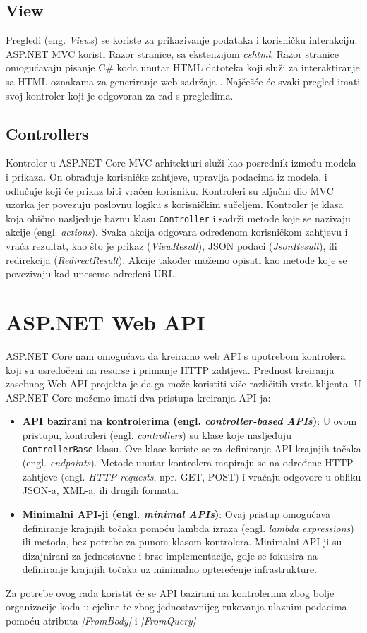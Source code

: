 \documentclass{foi}
\begin{document}
\subsection{View}
Pregledi (eng. \textit{Views}) se koriste za prikazivanje podataka i korisničku interakciju. ASP.NET MVC koristi Razor stranice, sa ekstenzijom \textit{cshtml}. Razor stranice omogućavaju pisanje C\# koda unutar HTML datoteka koji služi za interaktiranje sa HTML oznakama za generiranje web sadržaja \cite{Smith2022}. Najčešće će svaki pregled imati svoj kontroler koji je odgovoran za rad s pregledima.

\subsection{Controllers}
Kontroler u ASP.NET Core MVC arhitekturi služi kao posrednik između modela i prikaza. On obrađuje korisničke zahtjeve, upravlja podacima iz modela, i odlučuje koji će prikaz biti vraćen korisniku. Kontroleri su ključni dio MVC uzorka jer povezuju poslovnu logiku s korisničkim sučeljem.
Kontroler je klasa koja obično nasljeđuje baznu klasu \texttt{Controller} i sadrži metode koje se nazivaju akcije (engl. \textit{actions}). Svaka akcija odgovara određenom korisničkom zahtjevu i vraća rezultat, kao što je prikaz (\textit{ViewResult}), JSON podaci (\textit{JsonResult}), ili redirekcija (\textit{RedirectResult}).
Akcije također možemo opisati kao metode koje se povezivaju kad unesemo određeni URL. \cite{Walther2022}

\section{ASP.NET Web API}
ASP.NET Core nam omogućava da kreiramo web API s upotrebom kontrolera koji su usredočeni na resurse i primanje HTTP zahtjeva. Prednost kreiranja zasebnog Web API projekta je da ga može koristiti više različitih vrsta klijenta.\cite{ASPNet2023}
U ASP.NET Core možemo imati dva pristupa kreiranja API-ja:
\begin{itemize}
    \item \textbf{API bazirani na kontrolerima (engl. \textit{controller-based APIs})}: U ovom pristupu, kontroleri (engl. \textit{controllers}) su klase koje nasljeđuju \texttt{ControllerBase} klasu. Ove klase koriste se za definiranje API krajnjih točaka (engl. \textit{endpoints}). Metode unutar kontrolera mapiraju se na određene HTTP zahtjeve (engl. \textit{HTTP requests}, npr. GET, POST) i vraćaju odgovore u obliku JSON-a, XML-a, ili drugih formata.

    \item \textbf{Minimalni API-ji (engl. \textit{minimal APIs})}: Ovaj pristup omogućava definiranje krajnjih točaka pomoću lambda izraza (engl. \textit{lambda expressions}) ili metoda, bez potrebe za punom klasom kontrolera. Minimalni API-ji su dizajnirani za jednostavne i brze implementacije, gdje se fokusira na definiranje krajnjih točaka uz minimalno opterećenje infrastrukture.
\end{itemize}
Za potrebe ovog rada koristit će se API bazirani na kontrolerima zbog bolje organizacije koda u cjeline te zbog jednostavnijeg rukovanja ulaznim podacima pomoću atributa \textit{[FromBody]} i \textit{[FromQuery]} 
\end{document}
